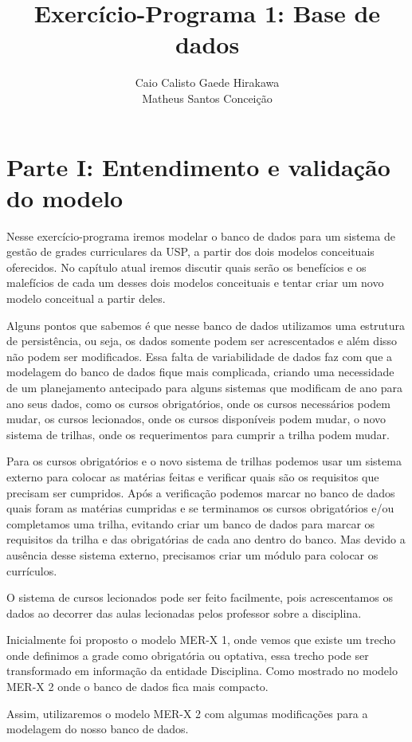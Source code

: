 \documentclass{report}
\author{Caio Calisto Gaede Hirakawa \\ Matheus Santos Conceição}
\title{Exercício-Programa 1: Base de dados}
\begin{document}
\maketitle
\tableofcontents
\chapter{Parte I: Entendimento e validação do modelo}
Nesse exercício-programa iremos modelar o banco de dados para um sistema de gestão de grades curriculares da USP, a partir dos dois modelos conceituais oferecidos. No capítulo atual iremos discutir quais serão os benefícios e os malefícios de cada um desses dois modelos conceituais e tentar criar um novo modelo conceitual a partir deles.

Alguns pontos que sabemos é que nesse banco de dados utilizamos uma estrutura de persistência, ou seja, os dados somente podem ser acrescentados e além disso não podem ser modificados. Essa falta de variabilidade de dados faz com que a modelagem do banco de dados fique mais complicada, criando uma necessidade de um planejamento antecipado para alguns sistemas que modificam de ano para ano seus dados, como os cursos obrigatórios, onde os cursos necessários podem mudar, os cursos lecionados, onde os cursos disponíveis podem mudar, o novo sistema de trilhas, onde os requerimentos para cumprir a trilha podem mudar.

Para os cursos obrigatórios e o novo sistema de trilhas podemos usar um sistema externo para colocar as matérias feitas e verificar quais são os requisitos que precisam ser cumpridos. Após a verificação podemos marcar no banco de dados quais foram as matérias cumpridas e se terminamos os cursos obrigatórios e/ou completamos uma trilha, evitando criar um banco de dados para marcar os requisitos da trilha e das obrigatórias de cada ano dentro do banco. Mas devido a ausência desse sistema externo, precisamos criar um módulo para colocar os currículos.

O sistema de cursos lecionados pode ser feito facilmente, pois acrescentamos os dados ao decorrer das aulas lecionadas pelos  professor sobre a disciplina.

Inicialmente foi proposto o modelo MER-X 1, onde vemos que existe um trecho onde definimos a grade como obrigatória ou optativa, essa trecho pode ser transformado em informação da entidade Disciplina. Como mostrado no modelo MER-X 2 onde o banco de dados fica mais compacto.

Assim, utilizaremos o modelo MER-X 2 com algumas modificações para a modelagem do nosso banco de dados.
\end{document}
